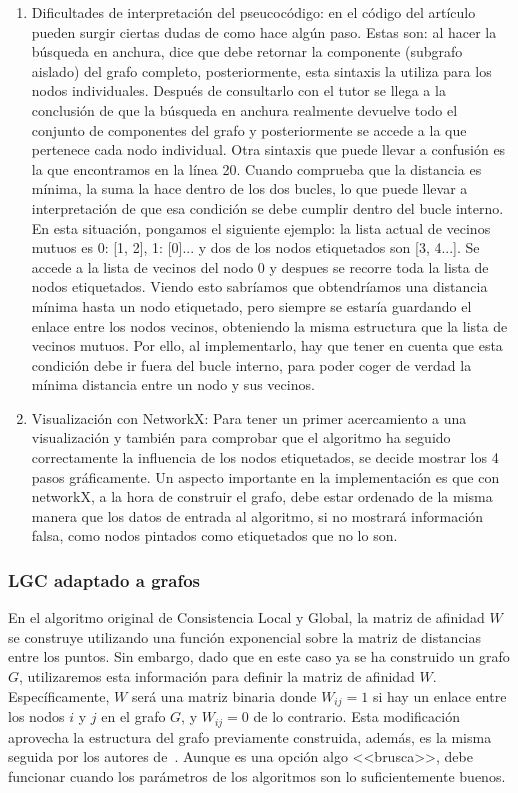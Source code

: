 \begin{enumerate}
	\item Dificultades de interpretación del pseucocódigo: en el código del artículo pueden surgir ciertas dudas de como hace algún paso. Estas son: al hacer la búsqueda en anchura, dice que debe retornar la componente (subgrafo aislado) del grafo completo, posteriormente, esta sintaxis la utiliza para los nodos individuales. Después de consultarlo con el tutor se llega a la conclusión de que la búsqueda en anchura realmente devuelve todo el conjunto de componentes del grafo y posteriormente se accede a la que pertenece cada nodo individual. Otra sintaxis que puede llevar a confusión es la que encontramos en la línea 20. Cuando comprueba que la distancia es mínima, la suma la hace dentro de los dos bucles, lo que puede llevar a interpretación de que esa condición se debe cumplir dentro del bucle interno. En esta situación, pongamos el siguiente ejemplo: la lista actual de vecinos mutuos es {0: [1, 2], 1: [0]...} y dos de los nodos etiquetados son [3, 4...]. Se accede a la lista de vecinos del nodo 0 y despues se recorre toda la lista de nodos etiquetados. Viendo esto sabríamos que obtendríamos una distancia mínima hasta un nodo etiquetado, pero siempre se estaría guardando el enlace entre los nodos vecinos, obteniendo la misma estructura que la lista de vecinos mutuos. Por ello, al implementarlo, hay que tener en cuenta que esta condición debe ir fuera del bucle interno, para poder coger de verdad la mínima distancia entre un nodo y sus vecinos.
	\item Visualización con NetworkX: Para tener un primer acercamiento a una visualización y también para comprobar que el algoritmo ha seguido correctamente la influencia de los nodos etiquetados, se decide mostrar los 4 pasos gráficamente. Un aspecto importante en la implementación es que con networkX, a la hora de construir el grafo, debe estar ordenado de la misma manera que los datos de entrada al algoritmo, si no mostrará información falsa, como nodos pintados como etiquetados que no lo son.
\end{enumerate}
\subsubsection{LGC adaptado a grafos}\label{sec5:LGC}
En el algoritmo original de Consistencia Local y Global, la matriz de afinidad $W$ se construye utilizando una función exponencial sobre la matriz de distancias entre los puntos. Sin embargo, dado que en este caso ya se ha construido un grafo $G$, utilizaremos esta información para definir la matriz de afinidad $W$. Específicamente, $W$ será una matriz binaria donde $W_{ij}=1$ si hay un enlace entre los nodos $i$ y $j$ en el grafo $G$, y $W_{ij}=0$ de lo contrario. Esta modificación aprovecha la estructura del grafo previamente construida, además, es la misma seguida por los autores de~\cite{gbili}. Aunque es una opción algo <<brusca>>, debe funcionar cuando los parámetros de los algoritmos son lo suficientemente buenos.


